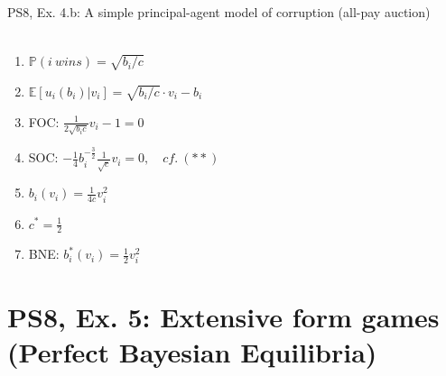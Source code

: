 \begin{frame}{PS8, Ex. 4.b: A simple principal-agent model of corruption (all-pay auction)}
\begin{multicols}{2}
\begin{align*}
      \end{align*} \vspace{-16pt}
      \begin{enumerate}
        \item $\mathbb{P}(i\ wins)=\sqrt{b_i/c}$
        \item $\mathbb{E}[u_i(b_i)|v_i]=\sqrt{b_i/c}\cdot v_i-b_i$
        \item FOC: $\frac{1}{2\sqrt{b_ic}}v_i-1=0$
        \item[] SOC: $-\frac{1}{4}b_i^{-\frac{3}{2}}\frac{1}{\sqrt{c}}v_i=0,\quad cf.\ (**)$
        \item $b_i(v_i)=\frac{1}{4c}v_i^2$
        \item $c^*=\frac{1}{2}$
        \item BNE: $b_i^*(v_i)=\frac{1}{2}v_i^2$
      \end{enumerate}
      \vfill\null
    \end{multicols}
\end{frame}



\section{PS8, Ex. 5: Extensive form games (Perfect Bayesian Equilibria)}


